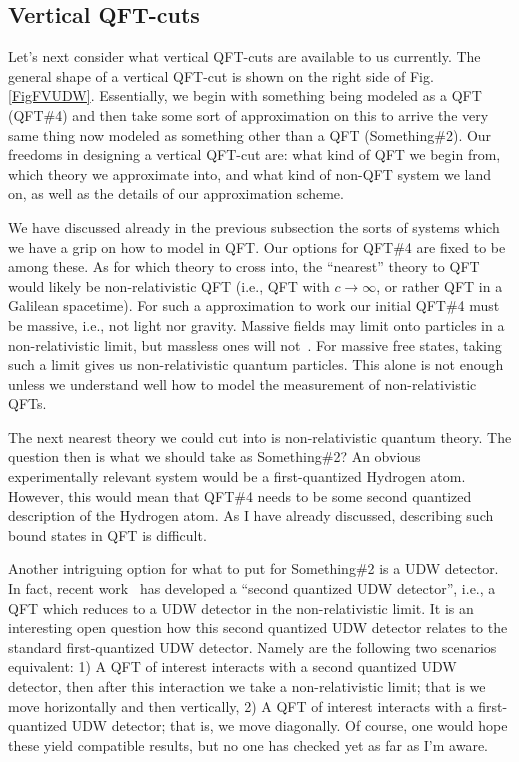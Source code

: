 \documentclass[prd,twocolumn,superscriptaddress,floatfix,amsmath,amssymb,amsfonts,nofootinbib]{revtex4-2}
\begin{document}
\subsection{Vertical QFT-cuts}
Let's next consider what vertical QFT-cuts are available to us currently. The general shape of a vertical QFT-cut is shown on the right side of Fig. \ref{FigFVUDW}. Essentially, we begin with something being modeled as a QFT (QFT\#4) and then take some sort of approximation on this to arrive the very same thing now modeled as something other than a QFT (Something\#2). Our freedoms in designing a vertical QFT-cut are: what kind of QFT we begin from, which theory we approximate into, and what kind of non-QFT system we land on, as well as the details of our approximation scheme.

We have discussed already in the previous subsection the sorts of systems which we have a grip on how to model in QFT. Our options for QFT\#4 are fixed to be among these. As for which theory to cross into, the ``nearest'' theory to QFT would likely be non-relativistic QFT (i.e., QFT with $c\to\infty$, or rather QFT in a Galilean spacetime). For such a approximation to work our initial QFT\#4 must be massive, i.e., not light nor gravity. Massive fields may limit onto particles in a non-relativistic limit, but massless ones will not~\cite{Lamb1995,Rosaler}. For massive free states, taking such a limit gives us non-relativistic quantum particles. This alone is not enough unless we understand well how to model the measurement of non-relativistic QFTs.

The next nearest theory we could cut into is non-relativistic quantum theory. The question then is what we should take as Something\#2? An obvious experimentally relevant system would be a first-quantized Hydrogen atom. However, this would mean that QFT\#4 needs to be some second quantized description of the Hydrogen atom. As I have already discussed, describing such bound states in QFT is difficult. %

Another intriguing option for what to put for Something\#2 is a UDW detector. In fact, recent work~\cite{FlaminiaAchim} has developed a ``second quantized UDW detector'', i.e., a QFT which reduces to a UDW detector in the non-relativistic limit. It is an interesting open question how this second quantized UDW detector relates to the standard first-quantized UDW detector. Namely are the following two scenarios equivalent: 1) A QFT of interest interacts with a second quantized UDW detector, then after this interaction we take a non-relativistic limit; that is we move horizontally and then vertically, 2) A QFT of interest interacts with a first-quantized UDW detector; that is, we move diagonally. Of course, one would hope these yield compatible results, but no one has checked yet as far as I'm aware.
\end{document}
